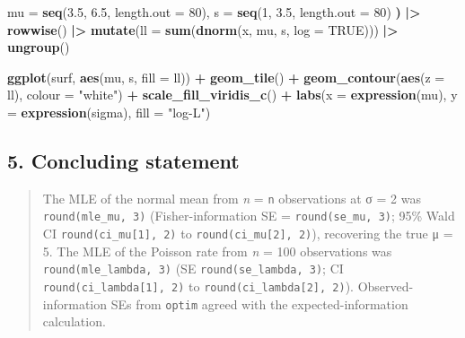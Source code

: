 \documentclass[
]{article}
\newenvironment{Shaded}{\begin{snugshade}}{\end{snugshade}}
\newcommand{\AttributeTok}[1]{\textcolor[rgb]{0.13,0.29,0.53}{#1}}
\newcommand{\ConstantTok}[1]{\textcolor[rgb]{0.56,0.35,0.01}{#1}}
\newcommand{\DecValTok}[1]{\textcolor[rgb]{0.00,0.00,0.81}{#1}}
\newcommand{\ErrorTok}[1]{\textcolor[rgb]{0.64,0.00,0.00}{\textbf{#1}}}
\newcommand{\FloatTok}[1]{\textcolor[rgb]{0.00,0.00,0.81}{#1}}
\newcommand{\FunctionTok}[1]{\textcolor[rgb]{0.13,0.29,0.53}{\textbf{#1}}}
\newcommand{\NormalTok}[1]{#1}
\newcommand{\OtherTok}[1]{\textcolor[rgb]{0.56,0.35,0.01}{#1}}
\newcommand{\SpecialCharTok}[1]{\textcolor[rgb]{0.81,0.36,0.00}{\textbf{#1}}}
\newcommand{\StringTok}[1]{\textcolor[rgb]{0.31,0.60,0.02}{#1}}
\begin{document}
\begin{Shaded}
\begin{Highlighting}[]
\NormalTok{  mu }\OtherTok{=} \FunctionTok{seq}\NormalTok{(}\FloatTok{3.5}\NormalTok{, }\FloatTok{6.5}\NormalTok{, }\AttributeTok{length.out =} \DecValTok{80}\NormalTok{),}
\NormalTok{  s  }\OtherTok{=} \FunctionTok{seq}\NormalTok{(}\DecValTok{1}\NormalTok{, }\FloatTok{3.5}\NormalTok{, }\AttributeTok{length.out =} \DecValTok{80}\NormalTok{)}
\ErrorTok{)} \SpecialCharTok{|\textgreater{}}
  \FunctionTok{rowwise}\NormalTok{() }\SpecialCharTok{|\textgreater{}}
  \FunctionTok{mutate}\NormalTok{(}\AttributeTok{ll =} \FunctionTok{sum}\NormalTok{(}\FunctionTok{dnorm}\NormalTok{(x, mu, s, }\AttributeTok{log =} \ConstantTok{TRUE}\NormalTok{))) }\SpecialCharTok{|\textgreater{}}
  \FunctionTok{ungroup}\NormalTok{()}
\end{Highlighting}
\end{Shaded}

\begin{Shaded}
\begin{Highlighting}[]
\FunctionTok{ggplot}\NormalTok{(surf, }\FunctionTok{aes}\NormalTok{(mu, s, }\AttributeTok{fill =}\NormalTok{ ll)) }\SpecialCharTok{+}
  \FunctionTok{geom\_tile}\NormalTok{() }\SpecialCharTok{+}
  \FunctionTok{geom\_contour}\NormalTok{(}\FunctionTok{aes}\NormalTok{(}\AttributeTok{z =}\NormalTok{ ll), }\AttributeTok{colour =} \StringTok{"white"}\NormalTok{) }\SpecialCharTok{+}
  \FunctionTok{scale\_fill\_viridis\_c}\NormalTok{() }\SpecialCharTok{+}
  \FunctionTok{labs}\NormalTok{(}\AttributeTok{x =} \FunctionTok{expression}\NormalTok{(mu), }\AttributeTok{y =} \FunctionTok{expression}\NormalTok{(sigma), }\AttributeTok{fill =} \StringTok{"log{-}L"}\NormalTok{)}
\end{Highlighting}
\end{Shaded}

\subsection{5. Concluding statement}\label{concluding-statement}

\begin{quote}
The MLE of the normal mean from \emph{n} = \texttt{n} observations at σ
= 2 was \texttt{round(mle\_mu,\ 3)} (Fisher-information SE =
\texttt{round(se\_mu,\ 3)}; 95\% Wald CI
\texttt{round(ci\_mu{[}1{]},\ 2)} to \texttt{round(ci\_mu{[}2{]},\ 2)}),
recovering the true μ = 5. The MLE of the Poisson rate from \emph{n} =
100 observations was \texttt{round(mle\_lambda,\ 3)} (SE
\texttt{round(se\_lambda,\ 3)}; CI \texttt{round(ci\_lambda{[}1{]},\ 2)}
to \texttt{round(ci\_lambda{[}2{]},\ 2)}). Observed-information SEs from
\texttt{optim} agreed with the expected-information calculation.
\end{quote}
\end{document}
